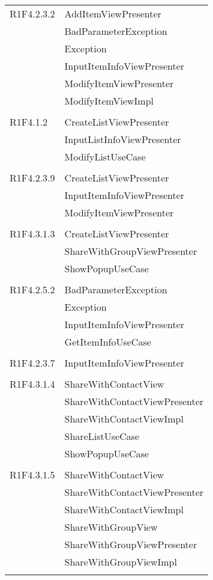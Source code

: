 \begin{center}
\begin{longtable}{|p{7cm}|p{5cm}|}
		R1F4.2.3.2 & AddItemViewPresenter \\ & BadParameterException \\ & Exception \\ & InputItemInfoViewPresenter \\ & ModifyItemViewPresenter \\ & ModifyItemViewImpl \\ & \\ \hline
		R1F4.1.2 & CreateListViewPresenter \\ & InputListInfoViewPresenter \\ & ModifyListUseCase \\ & \\ \hline
		R1F4.2.3.9 & CreateListViewPresenter \\ & InputItemInfoViewPresenter \\ & ModifyItemViewPresenter \\ & \\ \hline
		R1F4.3.1.3 & CreateListViewPresenter \\ & ShareWithGroupViewPresenter \\ & ShowPopupUseCase \\ & \\ \hline
		R1F4.2.5.2 & BadParameterException \\ & Exception \\ & InputItemInfoViewPresenter \\ & GetItemInfoUseCase \\ & \\ \hline
		R1F4.2.3.7 & InputItemInfoViewPresenter \\ & \\ \hline
		R1F4.3.1.4 & ShareWithContactView \\ & ShareWithContactViewPresenter \\ & ShareWithContactViewImpl \\ & ShareListUseCase \\ & ShowPopupUseCase \\ & \\ \hline
		R1F4.3.1.5 & ShareWithContactView \\ & ShareWithContactViewPresenter \\ & ShareWithContactViewImpl \\ & ShareWithGroupView \\ & ShareWithGroupViewPresenter \\ & ShareWithGroupViewImpl \\ & \\ \hline

\end{longtable}
\end{center}
